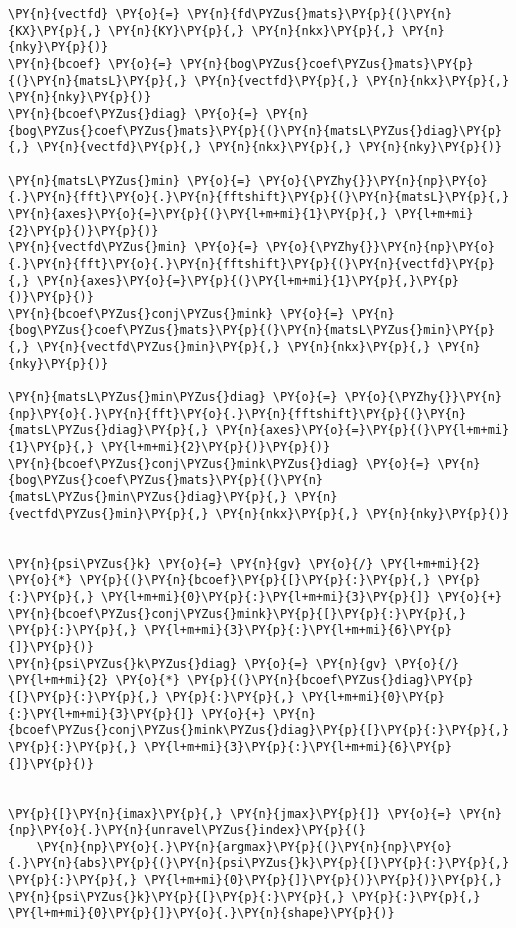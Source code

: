 \begin{Verbatim}[commandchars=\\\{\}]
\PY{n}{vectfd} \PY{o}{=} \PY{n}{fd\PYZus{}mats}\PY{p}{(}\PY{n}{KX}\PY{p}{,} \PY{n}{KY}\PY{p}{,} \PY{n}{nkx}\PY{p}{,} \PY{n}{nky}\PY{p}{)}
\PY{n}{bcoef} \PY{o}{=} \PY{n}{bog\PYZus{}coef\PYZus{}mats}\PY{p}{(}\PY{n}{matsL}\PY{p}{,} \PY{n}{vectfd}\PY{p}{,} \PY{n}{nkx}\PY{p}{,} \PY{n}{nky}\PY{p}{)}
\PY{n}{bcoef\PYZus{}diag} \PY{o}{=} \PY{n}{bog\PYZus{}coef\PYZus{}mats}\PY{p}{(}\PY{n}{matsL\PYZus{}diag}\PY{p}{,} \PY{n}{vectfd}\PY{p}{,} \PY{n}{nkx}\PY{p}{,} \PY{n}{nky}\PY{p}{)}

\PY{n}{matsL\PYZus{}min} \PY{o}{=} \PY{o}{\PYZhy{}}\PY{n}{np}\PY{o}{.}\PY{n}{fft}\PY{o}{.}\PY{n}{fftshift}\PY{p}{(}\PY{n}{matsL}\PY{p}{,} \PY{n}{axes}\PY{o}{=}\PY{p}{(}\PY{l+m+mi}{1}\PY{p}{,} \PY{l+m+mi}{2}\PY{p}{)}\PY{p}{)}
\PY{n}{vectfd\PYZus{}min} \PY{o}{=} \PY{o}{\PYZhy{}}\PY{n}{np}\PY{o}{.}\PY{n}{fft}\PY{o}{.}\PY{n}{fftshift}\PY{p}{(}\PY{n}{vectfd}\PY{p}{,} \PY{n}{axes}\PY{o}{=}\PY{p}{(}\PY{l+m+mi}{1}\PY{p}{,}\PY{p}{)}\PY{p}{)}
\PY{n}{bcoef\PYZus{}conj\PYZus{}mink} \PY{o}{=} \PY{n}{bog\PYZus{}coef\PYZus{}mats}\PY{p}{(}\PY{n}{matsL\PYZus{}min}\PY{p}{,} \PY{n}{vectfd\PYZus{}min}\PY{p}{,} \PY{n}{nkx}\PY{p}{,} \PY{n}{nky}\PY{p}{)}

\PY{n}{matsL\PYZus{}min\PYZus{}diag} \PY{o}{=} \PY{o}{\PYZhy{}}\PY{n}{np}\PY{o}{.}\PY{n}{fft}\PY{o}{.}\PY{n}{fftshift}\PY{p}{(}\PY{n}{matsL\PYZus{}diag}\PY{p}{,} \PY{n}{axes}\PY{o}{=}\PY{p}{(}\PY{l+m+mi}{1}\PY{p}{,} \PY{l+m+mi}{2}\PY{p}{)}\PY{p}{)}
\PY{n}{bcoef\PYZus{}conj\PYZus{}mink\PYZus{}diag} \PY{o}{=} \PY{n}{bog\PYZus{}coef\PYZus{}mats}\PY{p}{(}\PY{n}{matsL\PYZus{}min\PYZus{}diag}\PY{p}{,} \PY{n}{vectfd\PYZus{}min}\PY{p}{,} \PY{n}{nkx}\PY{p}{,} \PY{n}{nky}\PY{p}{)}


\PY{n}{psi\PYZus{}k} \PY{o}{=} \PY{n}{gv} \PY{o}{/} \PY{l+m+mi}{2} \PY{o}{*} \PY{p}{(}\PY{n}{bcoef}\PY{p}{[}\PY{p}{:}\PY{p}{,} \PY{p}{:}\PY{p}{,} \PY{l+m+mi}{0}\PY{p}{:}\PY{l+m+mi}{3}\PY{p}{]} \PY{o}{+} \PY{n}{bcoef\PYZus{}conj\PYZus{}mink}\PY{p}{[}\PY{p}{:}\PY{p}{,} \PY{p}{:}\PY{p}{,} \PY{l+m+mi}{3}\PY{p}{:}\PY{l+m+mi}{6}\PY{p}{]}\PY{p}{)}
\PY{n}{psi\PYZus{}k\PYZus{}diag} \PY{o}{=} \PY{n}{gv} \PY{o}{/} \PY{l+m+mi}{2} \PY{o}{*} \PY{p}{(}\PY{n}{bcoef\PYZus{}diag}\PY{p}{[}\PY{p}{:}\PY{p}{,} \PY{p}{:}\PY{p}{,} \PY{l+m+mi}{0}\PY{p}{:}\PY{l+m+mi}{3}\PY{p}{]} \PY{o}{+} \PY{n}{bcoef\PYZus{}conj\PYZus{}mink\PYZus{}diag}\PY{p}{[}\PY{p}{:}\PY{p}{,} \PY{p}{:}\PY{p}{,} \PY{l+m+mi}{3}\PY{p}{:}\PY{l+m+mi}{6}\PY{p}{]}\PY{p}{)}


\PY{p}{[}\PY{n}{imax}\PY{p}{,} \PY{n}{jmax}\PY{p}{]} \PY{o}{=} \PY{n}{np}\PY{o}{.}\PY{n}{unravel\PYZus{}index}\PY{p}{(}
    \PY{n}{np}\PY{o}{.}\PY{n}{argmax}\PY{p}{(}\PY{n}{np}\PY{o}{.}\PY{n}{abs}\PY{p}{(}\PY{n}{psi\PYZus{}k}\PY{p}{[}\PY{p}{:}\PY{p}{,} \PY{p}{:}\PY{p}{,} \PY{l+m+mi}{0}\PY{p}{]}\PY{p}{)}\PY{p}{)}\PY{p}{,} \PY{n}{psi\PYZus{}k}\PY{p}{[}\PY{p}{:}\PY{p}{,} \PY{p}{:}\PY{p}{,} \PY{l+m+mi}{0}\PY{p}{]}\PY{o}{.}\PY{n}{shape}\PY{p}{)}



\end{Verbatim}
